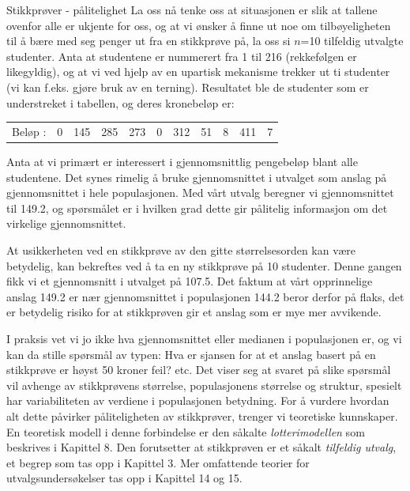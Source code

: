 \begin{eksempel}{Stikkprøver - pålitelighet}
La oss nå tenke oss at situasjonen er slik at tallene ovenfor
alle er ukjente for oss, og at vi ønsker å finne ut noe om
tilbøyeligheten til å bære med seg penger ut fra en stikkprøve
på, la oss si $n$=10 tilfeldig utvalgte studenter.  Anta at
studentene er nummerert fra 1 til 216 (rekkefølgen er likegyldig),
og at vi ved hjelp av en upartisk mekanisme trekker ut ti studenter
(vi kan f.eks. gjøre bruk av en terning).  Resultatet ble de studenter
som er understreket i tabellen, og deres kronebeløp er:

\begin{center} 
 \begin{tabular}{lcccccccccc}                                         
 Beløp :&  0 &  145 &  285 &  273 &  0 & 312 &  51 &  8 & 411 & 7
 \end{tabular}
\end{center}


\noindent Anta at vi primært er interessert i gjennomsnittlig pengebeløp
blant alle studentene.  Det synes rimelig å bruke gjennomsnittet
i utvalget som anslag på gjennomsnittet i hele populasjonen.  Med
vårt utvalg beregner vi gjennomsnittet til 149.2, og spørsmålet
er i hvilken grad dette gir pålitelig informasjon om det
virkelige gjennomsnittet.

At usikkerheten ved en stikkprøve av den gitte størrelsesorden
kan være betydelig, kan bekreftes ved å ta en ny stikkprøve på 10
studenter.  Denne gangen fikk vi et gjennomsnitt i utvalget på
107.5.  Det faktum at vårt opp\-rinne\-lige anslag 149.2 er nær
gjennomsnittet i populasjonen 144.2 beror derfor på flaks, det er
betydelig risiko for at stikkprøven gir et anslag som er mye mer
avvikende.
           
I praksis vet vi jo ikke hva gjennomsnittet eller medianen i
populasjonen er, og vi kan da stille spørsmål av typen:  Hva er
sjansen for at et anslag basert på en stikkprøve er høyst 50
kroner feil?  etc.  Det viser seg at svaret på slike spørsmål vil
avhenge av stikkprøvens størrelse, populasjonens størrelse og
struktur, spesielt har variabiliteten av verdiene i populasjonen
betydning.  For å vurdere hvordan alt dette påvirker
påliteligheten av stikkprøver, trenger vi teoretiske
kunnskaper.  En teoretisk modell i denne forbindelse er den
såkalte {\em lotterimodellen} som beskrives i Kapittel 8.  Den
forutsetter at stikkprøven er et såkalt {\em tilfeldig utvalg}, et
begrep som tas opp i Kapittel 3. Mer omfattende teorier for
utvalgsundersøkelser tas opp i Kapittel 14 og 15.
\end{eksempel}

